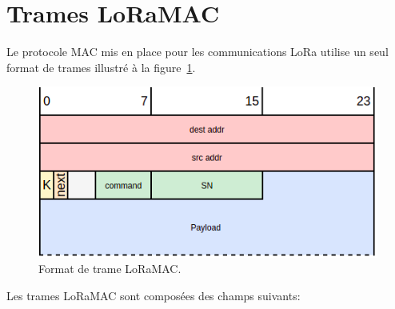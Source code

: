 \section{Trames LoRaMAC}\label{sec:archi-loramac-frame}
\renewcommand{\rightmark}{Trames LoRaMac}

    Le protocole MAC mis en place pour les communications LoRa utilise un seul format de trames illustré à la figure~\ref{fig:archi-frame}.
    \begin{figure}[H]
        \centering
        \includegraphics[scale=0.5]{res/pictures/loramac-frame.drawio.png}
        \caption{Format de trame LoRaMAC.}
        \label{fig:archi-frame}
    \end{figure}
    Les trames LoRaMAC sont composées des champs suivants:
